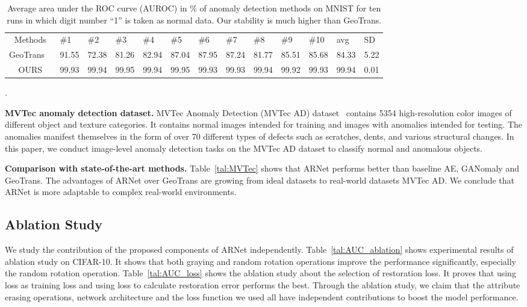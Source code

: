 \documentclass[journal]{IEEEtran}
\begin{document}
\renewcommand \arraystretch{0.95}
\begin{table*}[!htb]
	\centering
	\caption{Average area under the ROC curve (AUROC) in \% of anomaly detection methods on MNIST for ten runs in which digit number ``1'' is taken as normal data. Our stability is much higher than GeoTrans.}
	\small
	\begin{tabular}{cx{0.8cm}x{0.8cm}x{0.8cm}x{0.8cm}x{0.8cm}x{0.8cm}x{0.8cm}x{0.8cm}x{0.8cm}x{0.8cm}x{0.8cm}x{0.7cm}}
	\toprule
	Methods & \#1 & \#2 & \#3 & \#4 & \#5 & \#6 & \#7 & \#8 & \#9 & \#10 & avg & SD\\
	\cmidrule(lr){1-1} \cmidrule(lr){2-2} \cmidrule(lr){3-3} \cmidrule(lr){4-4} \cmidrule(lr){5-5} \cmidrule(lr){6-6} \cmidrule(lr){7-7} \cmidrule(lr){8-8} \cmidrule(lr){9-9} \cmidrule(lr){10-10} \cmidrule(lr){11-11} \cmidrule(lr){12-12} \cmidrule(lr){13-13}
	GeoTrans
	~\cite{golan2018deep} 
	& 91.55 & 72.38 & 81.26 & 82.94 & 87.04 & 87.95 & 87.24 & 81.77 & 85.51 & 85.68 & 84.33 & 5.22\\
OURS & 99.93 & 99.94 & 99.95 & 99.94 & 99.95 & 99.93 & 99.93 & 99.94 & 99.92 & 99.93 & 99.94 & 0.01\\
	\bottomrule
	\end{tabular}
	\label{tal:stable2}.
\end{table*}

\noindent\textbf{MVTec anomaly detection dataset.} MVTec Anomaly Detection (MVTec AD) dataset~\cite{bergmann2019mvtec} contains 5354 high-resolution color images of different object and texture categories. It contains normal images intended for training and images with anomalies intended for testing. The anomalies manifest themselves in the form of over 70 different types of defects such as scratches, dents, and various structural changes. In this paper, we conduct image-level anomaly detection tasks on the MVTec AD dataset to classify normal and anomalous objects.

\noindent\textbf{Comparison with state-of-the-art methods.} Table~\ref{tal:MVTec} shows that ARNet performs better than baseline AE, GANomaly and GeoTrans. The advantages of ARNet over GeoTrans are growing from ideal datasets to real-world datasets MVTec AD. We conclude that ARNet is more adaptable to complex real-world environments. 

\subsection{Ablation Study}
We study the contribution of the proposed components of ARNet independently. Table~\ref{tal:AUC_ablation} shows experimental results of ablation study on CIFAR-10. It shows that both graying and random rotation operations improve the performance significantly, especially the random rotation operation. Table~\ref{tal:AUC_loss} shows the ablation study about the selection of restoration loss. It proves that using  loss as training loss and using  loss to calculate restoration error performs the best. Through the ablation study, we claim that the attribute erasing operations, network architecture and the loss function we used all have independent contributions to boost the model performance.
\end{document}
